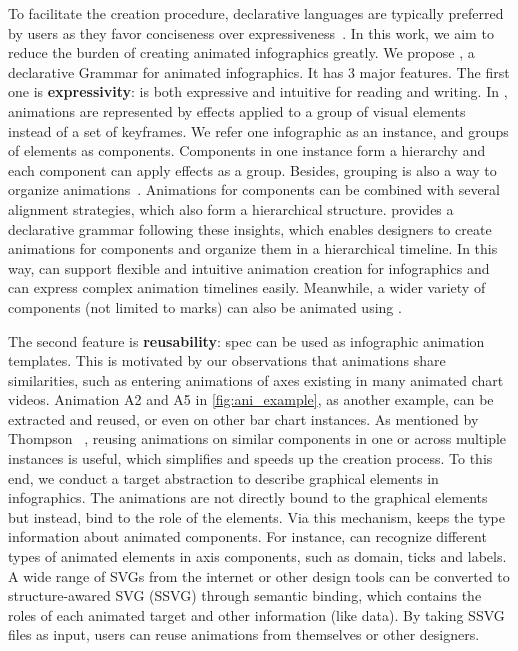 To facilitate the creation procedure,  declarative languages are typically preferred by users as they favor conciseness over expressiveness~\cite{mcnutt2023nogrammar}. 
In this work, we aim to reduce the burden of creating animated infographics greatly. 
We propose \gaia{}, a declarative Grammar for animated infographics. 
It has 3 major features. 
The first one is \textbf{expressivity}: \gaia{} is both expressive and intuitive for reading and writing.
In \gaia{}, animations are represented by effects applied to a group of visual elements instead of a set of keyframes.
We refer one infographic as an instance, and groups of elements as components.
Components in one instance form a hierarchy and each component can apply effects as a group.
Besides, grouping is also a way to organize animations~\cite{thompson2020understanding}. Animations for components can be combined with several alignment strategies, which also form a hierarchical structure. 
\gaia{} provides a declarative grammar following these insights, which enables designers to create animations for components and organize them in a hierarchical timeline.
In this way, \gaia{} can support flexible and intuitive animation creation for infographics and can express complex animation timelines easily.
Meanwhile, a wider variety of components (not limited to marks) can also be animated using \gaia{}.

The second feature is \textbf{reusability}: \gaia{} spec can be used as infographic animation templates.
This is motivated by our observations that animations share similarities, such as entering animations of axes existing in many animated chart videos. 
Animation A2 and A5 in \autoref{fig:ani_example}, as another example, can be extracted and reused, or even on other bar chart instances.
As mentioned by Thompson \etal~\cite{thompson2020understanding}, reusing animations on similar components in one or across multiple instances is useful, which simplifies and speeds up the creation process.
To this end, we conduct a target abstraction to describe graphical elements in infographics. 
The animations are not directly bound to the graphical elements but instead, bind to the role of the elements. 
Via this mechanism, \gaia{} keeps the type information about animated components. 
For instance, \gaia{} can recognize different types of animated elements in axis components, such as domain, ticks and labels.
A wide range of SVGs from the internet or other design tools can be converted to structure-awared SVG (SSVG) through semantic binding, which contains the roles of each animated target and other information (like data). 
By taking SSVG files as input, users can reuse animations from themselves or other designers.

